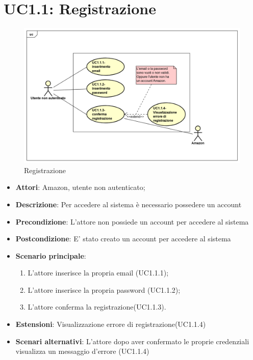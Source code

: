 \section{UC1.1: Registrazione}
\label{UC1.1}
\begin{figure} [h]
	\centering
	\includegraphics[scale=0.4]{./Diagram/UC1-1.png}
	\caption{Registrazione}\label{}
\end{figure}

\begin{itemize}
	\item \textbf{Attori}: Amazon, utente non autenticato;
	\item \textbf{Descrizione}: Per accedere al sistema è necessario possedere un account
	\item \textbf{Precondizione}: L'attore non possiede un account per accedere al sistema
	\item \textbf{Postcondizione}: E' stato creato un account per accedere al sistema
	\item \textbf{Scenario principale}:
	\begin{enumerate} \item L'attore inserisce la propria email (UC1.1.1);  \item  L'attore inserisce la propria password (UC1.1.2);  \item 
		L'attore conferma la registrazione(UC1.1.3).\end{enumerate}
	\item \textbf{Estensioni}:
	Visualizzazione errore di registrazione(UC1.1.4)
	\item \textbf{Scenari alternativi}:
	L'attore dopo aver confermato le proprie credenziali visualizza un messaggio d'errore (UC1.1.4)
\end{itemize}

